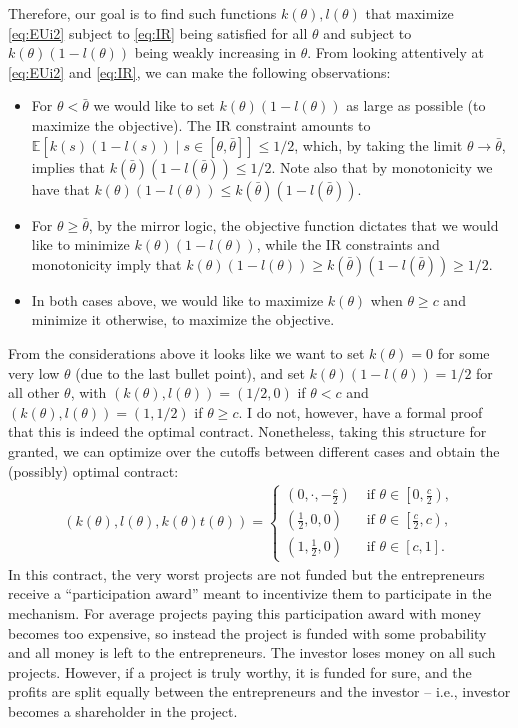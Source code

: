 \documentclass[a4paper]{article}
\begin{document}
\begin{enumerate}
		Therefore, our goal is to find such functions $k(\theta),l(\theta)$ that maximize \eqref{eq:EUi2} subject to \eqref{eq:IR} being satisfied for all $\theta$ and subject to $k(\theta)(1-l(\theta))$ being weakly increasing in $\theta$. From looking attentively at \eqref{eq:EUi2} and \eqref{eq:IR}, we can make the following observations:
		\begin{itemize}
			\item For $\theta < \bar{\theta}$ we would like to set $k(\theta)(1-l(\theta))$ as large as possible (to maximize the objective). The IR constraint amounts to $\mathbb{E}\left[ k(s)(1-l(s)) \mid s \in [\theta,\bar{\theta}] \right] \leq 1/2$, which, by taking the limit $\theta \to \bar{\theta}$, implies that $k(\bar{\theta})(1-l(\bar{\theta})) \leq 1/2$. Note also that by monotonicity we have that $k(\theta)(1-l(\theta)) \leq k(\bar{\theta})(1-l(\bar{\theta}))$.
			\item For $\theta \geq \bar{\theta}$, by the mirror logic, the objective function dictates that we would like to minimize $k(\theta)(1-l(\theta))$, while the IR constraints and monotonicity imply that $k(\theta)(1-l(\theta)) \geq k(\bar{\theta})(1-l(\bar{\theta})) \geq 1/2$.
			\item In both cases above, we would like to maximize $k(\theta)$ when $\theta \geq c$ and minimize it otherwise, to maximize the objective. 
		\end{itemize}
		From the considerations above it looks like we want to set $k(\theta)=0$ for some very low $\theta$ (due to the last bullet point), and set $k(\theta)(1-l(\theta)) = 1/2$ for all other $\theta$, with $(k(\theta),l(\theta))=(1/2,0)$ if $\theta < c$ and $(k(\theta),l(\theta))=(1,1/2)$ if $\theta \geq c$. I do not, however, have a formal proof that this is indeed the optimal contract. Nonetheless, taking this structure for granted, we can optimize over the cutoffs between different cases and obtain the (possibly) optimal contract:
		\begin{align*}
			(k(\theta),l(\theta),k(\theta)t(\theta)) = \begin{cases}
				\left(0,\cdot,-\frac{c}{2}\right) & \text{ if } \theta \in \left[0,\frac{c}{2} \right),
				\\
				\left(\frac{1}{2},0,0\right) & \text{ if } \theta \in \left[\frac{c}{2},c \right),
				\\
				\left(1,\frac{1}{2},0\right) & \text{ if } \theta \in \left[c,1 \right].
			\end{cases}
		\end{align*}
		In this contract, the very worst projects are not funded but the entrepreneurs receive a ``participation award'' meant to incentivize them to participate in the mechanism. For average projects paying this participation award with money becomes too expensive, so instead the project is funded with some probability and all money is left to the entrepreneurs. The investor loses money on all such projects. However, if a project is truly worthy, it is funded for sure, and the profits are split equally between the entrepreneurs and the investor -- i.e., investor becomes a shareholder in the project.
		

\end{enumerate}
\end{document}
